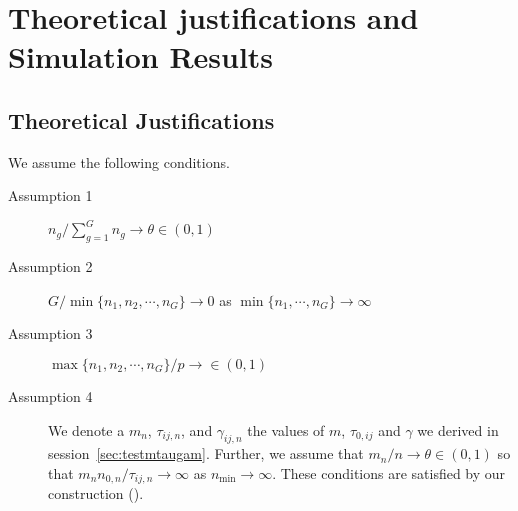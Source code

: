 \documentclass[12pt]{article}
\theoremstyle{plain}%
\theoremstyle{definition}
\def\log{\hbox{log}}
\def\log{\hbox{log}}
\def\trans{^{\rm T}}
\newcommand{\uF}       {\mbox{\boldmath$F$}}
\newcommand{\uS}       {\mbox{\boldmath$S$}}
\newcommand{\uX}       {\mbox{\boldmath$X$}}
\begin{document}

\section{Theoretical justifications and Simulation Results} \label{sec:theori}

\subsection{Theoretical Justifications} 
We assume the following conditions.
\begin{description}
  \item[Assumption 1] $n_g /\sum_{g=1}^{G}n_g \rightarrow \theta \in (0, 1)$
  \item[Assumption 2] $G / \min\{ n_1, n_2, \cdots, n_G \} \rightarrow 0$ as $\min\{ n_1, \cdots, n_G \} \rightarrow \infty$
  \item[Assumption 3] $\max\{ n_1, n_2, \cdots, n_G \}/p \rightarrow \in (0, 1)$ 
  \item[Assumption 4] We denote a $m_n$, $\tau_{ij,n}$, and $\gamma_{ij,n}$ the values of $m$, $\tau_{0,ij}$ and $\gamma$ we derived in session~\ref{sec:testmtaugam}. Further, we assume that $m_n/n \rightarrow \theta \in(0, 1)$ so that $m_n n_{0,n}/\tau_{ij,n} \rightarrow \infty$ as $n_{\min} \rightarrow \infty$. These conditions are satisfied by our construction (\citealp[see Appendix C of][]{zoh2018powerful}). 
\end{description}
\end{document}
